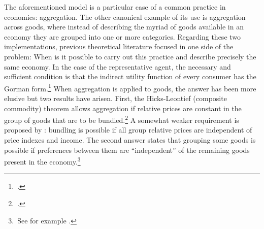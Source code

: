 \documentclass[english, a4paper, 12pt]{article}
\begin{document}
The aforementioned model is a particular case of a common practice in economics: aggregation. The other canonical example of its use is aggregation across goods, where instead of describing the myriad of goods available in an economy they are grouped into one or more categories. Regarding these two implementations, previous theoretical literature focused in one side of the problem: When is it possible to carry out this practice and describe precisely the same economy. In the case of the representative agent, the necessary and sufficient condition is that the indirect utility function of every consumer has the Gorman form.\footnote{\,\cite{Gorman53}.} When aggregation is applied to goods, the answer has been more elusive but two results have arisen. First, the Hicks-Leontief (composite commodity) theorem allows aggregation if relative prices are constant in the group of goods that are to be bundled.\footnote{\,\cite{Leontief36, HicksBook}.} A somewhat weaker requirement is proposed by \cite{Lewbel96}: bundling is possible if all group relative prices are independent of price indexes and income. The second answer states that grouping some goods is possible if preferences between them are ``independent'' of the remaining goods present in the economy.\footnote{\,See for example \cite{GormanSeparability}.} 
\end{document}
